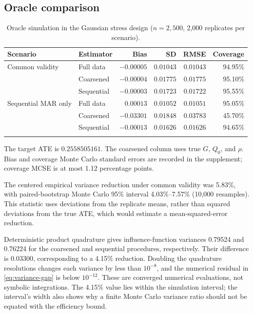 \subsection{Oracle comparison}

\begin{table}[htbp]
\centering
\begin{threeparttable}
\caption{Oracle simulation in the Gaussian stress design ($n=2{,}500$, 2,000 replicates per scenario).}
\label{tab:main-results}
\small
\setlength{\tabcolsep}{4pt}
\begin{tabular}{@{}llrrrr@{}}
\toprule
Scenario & Estimator & Bias & SD & RMSE & Coverage \\
\midrule
Common validity & Full data & $-0.00005$ & $0.01043$ & $0.01043$ & 94.95\% \\
 & Coarsened & $-0.00004$ & $0.01775$ & $0.01775$ & 95.10\% \\
 & Sequential & $-0.00003$ & $0.01723$ & $0.01722$ & 95.55\% \\
\addlinespace
Sequential MAR only & Full data & $0.00013$ & $0.01052$ & $0.01051$ & 95.05\% \\
 & Coarsened & $-0.03301$ & $0.01848$ & $0.03783$ & 45.70\% \\
 & Sequential & $-0.00013$ & $0.01626$ & $0.01626$ & 94.65\% \\
\addlinespace
\bottomrule
\end{tabular}
\begin{tablenotes}[flushleft]\footnotesize
\item The target ATE is $0.2558505161$. The coarsened column uses true $G$, $Q_0$, and $\rho$. Bias and coverage Monte Carlo standard errors are recorded in the supplement; coverage MCSE is at most 1.12 percentage points.
\end{tablenotes}
\end{threeparttable}
\end{table}

The centered empirical variance reduction under common validity was 5.83\%, with paired-bootstrap Monte Carlo 95\% interval 4.03\%--7.57\% (10,000 resamples). This statistic uses deviations from the replicate means, rather than squared deviations from the true ATE, which would estimate a mean-squared-error reduction.

Deterministic product quadrature gives influence-function variances 0.79524 and 0.76224 for the coarsened and sequential procedures, respectively. Their difference is 0.03300, corresponding to a 4.15\% reduction. Doubling the quadrature resolutions changes each variance by less than $10^{-8}$, and the numerical residual in \cref{eq:variance-gap} is below $10^{-12}$. These are converged numerical evaluations, not symbolic integrations. The 4.15\% value lies within the simulation interval; the interval's width also shows why a finite Monte Carlo variance ratio should not be equated with the efficiency bound.

